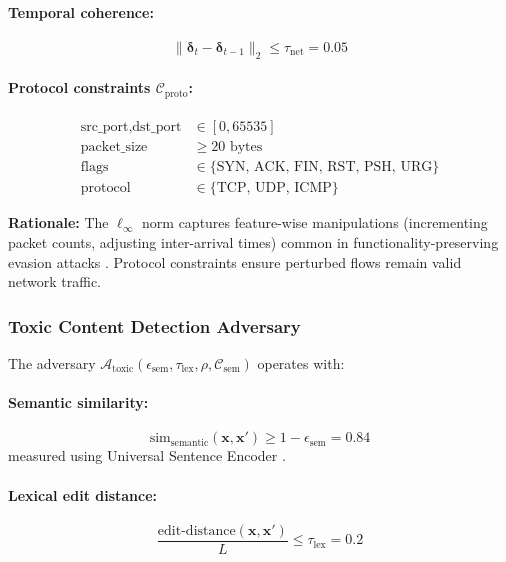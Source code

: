 \documentclass[12pt,a4paper]{article}
\theoremstyle{definition}
\newcommand{\Atoxic}{\mathcal{A}_{\text{toxic}}}
\begin{document}
\paragraph{Temporal coherence:}
\begin{equation}
\|\bm{\delta}_t - \bm{\delta}_{t-1}\|_2 \leq \tau_{\text{net}} = 0.05
\end{equation}

\paragraph{Protocol constraints $\mathcal{C}_{\text{proto}}$:}
\begin{align}
\text{src\_port}, \text{dst\_port} &\in [0, 65535] \\
\text{packet\_size} &\geq 20 \text{ bytes} \\
\text{flags} &\in \{\text{SYN, ACK, FIN, RST, PSH, URG}\} \\
\text{protocol} &\in \{\text{TCP, UDP, ICMP}\}
\end{align}

\textbf{Rationale:} The $\ell_\infty$ norm captures feature-wise manipulations (incrementing packet counts, adjusting inter-arrival times) common in functionality-preserving evasion attacks \citep{mccarthy2022functionality}. Protocol constraints ensure perturbed flows remain valid network traffic.

\subsubsection{Toxic Content Detection Adversary}

The adversary $\Atoxic(\epsilon_{\text{sem}}, \tau_{\text{lex}}, \rho, \mathcal{C}_{\text{sem}})$ operates with:

\paragraph{Semantic similarity:}
\begin{equation}
\text{sim}_{\text{semantic}}(\bm{x}, \bm{x}') \geq 1 - \epsilon_{\text{sem}} = 0.84
\end{equation}
measured using Universal Sentence Encoder \citep{cer2018universal}.

\paragraph{Lexical edit distance:}
\begin{equation}
\frac{\text{edit-distance}(\bm{x}, \bm{x}')}{L} \leq \tau_{\text{lex}} = 0.2
\end{equation}
\end{document}
